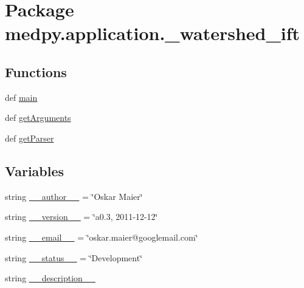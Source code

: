 \hypertarget{namespacemedpy_1_1application_1_1__watershed__ift}{
\section{Package medpy.application.\_\-watershed\_\-ift}
\label{namespacemedpy_1_1application_1_1__watershed__ift}
}
\subsection*{Functions}
\begin{DoxyCompactItemize}
\item 
def \hyperlink{namespacemedpy_1_1application_1_1__watershed__ift_a68bee332ce967b555c49dba3b2c96dc4}{main}
\item 
def \hyperlink{namespacemedpy_1_1application_1_1__watershed__ift_aabc1d688f0af7c06aea9d3016c0c66a1}{getArguments}
\item 
def \hyperlink{namespacemedpy_1_1application_1_1__watershed__ift_a34867f4a5d2d6e76ddc2d784fe4a501c}{getParser}
\end{DoxyCompactItemize}
\subsection*{Variables}
\begin{DoxyCompactItemize}
\item 
string \hyperlink{namespacemedpy_1_1application_1_1__watershed__ift_aac2d8e316506ddea703b2822fdb566c1}{\_\-\_\-author\_\-\_\-} = \char`\"{}Oskar Maier\char`\"{}
\item 
string \hyperlink{namespacemedpy_1_1application_1_1__watershed__ift_a08a416eb506e787245d380d9d5cf20cd}{\_\-\_\-version\_\-\_\-} = \char`\"{}a0.3, 2011-\/12-\/12\char`\"{}
\item 
string \hyperlink{namespacemedpy_1_1application_1_1__watershed__ift_a473ec907b408497d2197d386eec5ca68}{\_\-\_\-email\_\-\_\-} = \char`\"{}oskar.maier@googlemail.com\char`\"{}
\item 
string \hyperlink{namespacemedpy_1_1application_1_1__watershed__ift_aa2d2710b9034a91e55d264eb5a14fbe3}{\_\-\_\-status\_\-\_\-} = \char`\"{}Development\char`\"{}
\item 
string \hyperlink{namespacemedpy_1_1application_1_1__watershed__ift_acda2bfa5a19022cc907c4e1e6ab55468}{\_\-\_\-description\_\-\_\-}
\end{DoxyCompactItemize}


